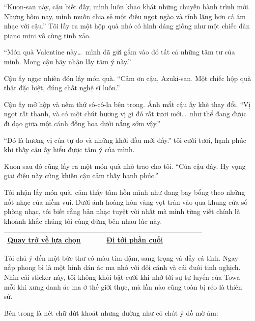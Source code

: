 \documentclass[../main.tex]{subfiles}
\begin{document}
``Kuon-san này, cậu biết đấy, mình luôn khao khát những chuyến hành trình mới. Nhưng hôm nay, mình muốn chia sẻ một điều ngọt ngào và tĩnh lặng hơn cả âm nhạc với cậu.'' Tôi lấy ra một hộp quà nhỏ có hình dáng giống như một chiếc đàn piano mini vô cùng tinh xảo.

``Món quà Valentine này\dots\ mình đã gửi gắm vào đó tất cả những tâm tư của mình. Mong cậu hãy nhận lấy tâm ý này.''

Cậu ấy ngạc nhiên đón lấy món quà. ``Cảm ơn cậu, Azuki-san. Một chiếc hộp quà thật đặc biệt, đúng chất nghệ sĩ luôn.''

Cậu ấy mở hộp và nếm thử sô-cô-la bên trong. Ánh mắt cậu ấy khẽ thay đổi. ``Vị ngọt rất thanh, và có một chút hương vị gì đó rất tươi mới\dots\ như thể đang được đi dạo giữa một cánh đồng hoa dưới nắng sớm vậy.''

``Đó là hương vị của tự do và những khởi đầu mới đấy.'' tôi cười tươi, hạnh phúc khi thấy cậu ấy hiểu được tâm ý của mình.

Kuon sau đó cũng lấy ra một món quà nhỏ trao cho tôi. ``Của cậu đây. Hy vọng giai điệu này cũng khiến cậu cảm thấy hạnh phúc.''

Tôi nhận lấy món quà, cảm thấy tâm hồn mình như đang bay bổng theo những nốt nhạc của niềm vui. Dưới ánh hoàng hôn vàng vọt tràn vào qua khung cửa sổ phòng nhạc, tôi biết rằng bản nhạc tuyệt vời nhất mà mình từng viết chính là khoảnh khắc chúng tôi cùng đứng bên nhau lúc này.

\begin{table}[H]
  \centering
  \setlength{\arrayrulewidth}{1pt}
  \begin{tabular}{|>{\centering\arraybackslash}p{0.4\linewidth}|>{\centering\arraybackslash}p{0.4\linewidth}|}
    \hline
    \hyperref[choice]{Quay trở về lựa chọn} & \hyperref[ending]{Đi tới phần cuối} \\ \hline
  \end{tabular}
\end{table}

\newpage
\label{kana}

Tôi chú ý đến một bức thư có màu tím đậm, sang trọng và đầy cá tính. Ngay nắp phong bì là một hình dán ác ma nhỏ với đôi cánh và cái đuôi tinh nghịch. Nhìn cái sticker này, tôi không khỏi bật cười khi nhớ tới sự tự luyến của Towa mỗi khi xưng danh ác ma ở thế giới thực, mà lần nào cũng toàn bị réo là thiên sứ.

Bên trong là nét chữ dứt khoát nhưng dường như có chút ý đồ mờ ám:
\end{document}

